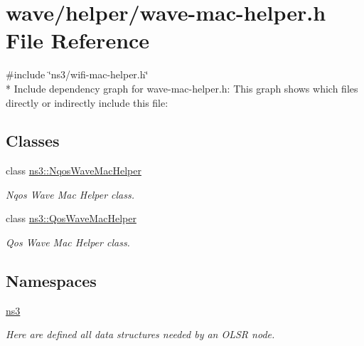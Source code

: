 \hypertarget{wave-mac-helper_8h}{}\section{wave/helper/wave-\/mac-\/helper.h File Reference}
\label{wave-mac-helper_8h}
{\ttfamily \#include \char`\"{}ns3/wifi-\/mac-\/helper.\+h\char`\"{}}\\*
Include dependency graph for wave-\/mac-\/helper.h\+:
This graph shows which files directly or indirectly include this file\+:
\subsection*{Classes}
\begin{DoxyCompactItemize}
\item 
class \hyperlink{classns3_1_1NqosWaveMacHelper}{ns3\+::\+Nqos\+Wave\+Mac\+Helper}
\begin{DoxyCompactList}\small\item\em Nqos Wave Mac Helper class. \end{DoxyCompactList}\item 
class \hyperlink{classns3_1_1QosWaveMacHelper}{ns3\+::\+Qos\+Wave\+Mac\+Helper}
\begin{DoxyCompactList}\small\item\em Qos Wave Mac Helper class. \end{DoxyCompactList}\end{DoxyCompactItemize}
\subsection*{Namespaces}
\begin{DoxyCompactItemize}
\item 
 \hyperlink{namespacens3}{ns3}
\begin{DoxyCompactList}\small\item\em Here are defined all data structures needed by an O\+L\+SR node. \end{DoxyCompactList}\end{DoxyCompactItemize}
